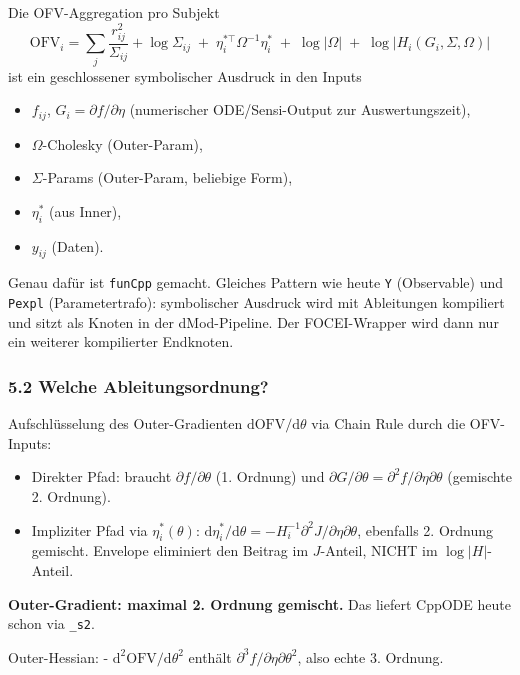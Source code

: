 \documentclass[
]{article}
\providecommand{\tightlist}{%
  \setlength{\itemsep}{0pt}\setlength{\parskip}{0pt}}
\begin{document}
Die OFV-Aggregation pro Subjekt \[
\mathrm{OFV}_i = \sum_j \frac{r_{ij}^2}{\Sigma_{ij}} + \log\Sigma_{ij}
\;+\; \eta_i^{*\top} \Omega^{-1} \eta_i^*
\;+\; \log|\Omega|
\;+\; \log|H_i(G_i, \Sigma, \Omega)|
\] ist ein geschlossener symbolischer Ausdruck in den Inputs

\begin{itemize}
\tightlist
\item
  \(f_{ij}\), \(G_i = \partial f / \partial \eta\) (numerischer
  ODE/Sensi-Output zur Auswertungszeit),
\item
  \(\Omega\)-Cholesky (Outer-Param),
\item
  \(\Sigma\)-Params (Outer-Param, beliebige Form),
\item
  \(\eta_i^*\) (aus Inner),
\item
  \(y_{ij}\) (Daten).
\end{itemize}

Genau dafür ist \texttt{funCpp} gemacht. Gleiches Pattern wie heute
\texttt{Y} (Observable) und \texttt{Pexpl} (Parametertrafo):
symbolischer Ausdruck wird mit Ableitungen kompiliert und sitzt als
Knoten in der dMod-Pipeline. Der FOCEI-Wrapper wird dann nur ein
weiterer kompilierter Endknoten.

\subsubsection{5.2 Welche
Ableitungsordnung?}\label{welche-ableitungsordnung}

Aufschlüsselung des Outer-Gradienten
\(\mathrm{d}\mathrm{OFV}/\mathrm{d}\theta\) via Chain Rule durch die
OFV-Inputs:

\begin{itemize}
\tightlist
\item
  Direkter Pfad: braucht \(\partial f/\partial\theta\) (1. Ordnung) und
  \(\partial G/\partial\theta = \partial^2 f / \partial\eta\partial\theta\)
  (gemischte 2. Ordnung).
\item
  Impliziter Pfad via \(\eta_i^*(\theta)\):
  \(\mathrm{d}\eta_i^*/\mathrm{d}\theta = -H_i^{-1} \partial^2 J/\partial\eta\partial\theta\),
  ebenfalls 2. Ordnung gemischt. Envelope eliminiert den Beitrag im
  \(J\)-Anteil, NICHT im \(\log|H|\)-Anteil.
\end{itemize}

\textbf{Outer-Gradient: maximal 2. Ordnung gemischt.} Das liefert CppODE
heute schon via \texttt{\_s2}.

Outer-Hessian: - \(\mathrm{d}^2\mathrm{OFV}/\mathrm{d}\theta^2\) enthält
\(\partial^3 f / \partial\eta\partial\theta^2\), also echte 3. Ordnung.
\end{document}
